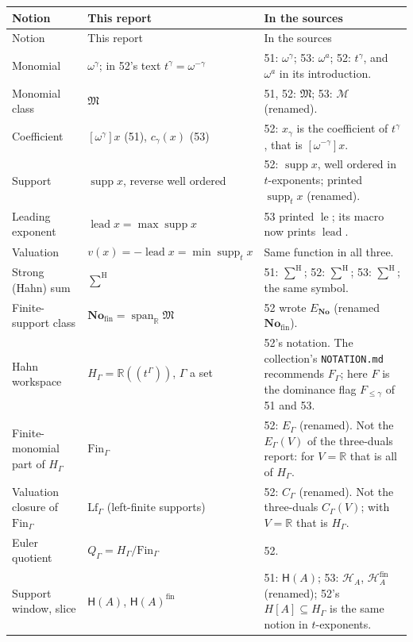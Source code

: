 \documentclass[11pt,letterpaper]{article}
\numberwithin{equation}{section}
\theoremstyle{definition}
\theoremstyle{remark}
\newcommand{\No}{\mathbf{No}}
\newcommand{\R}{\mathbb{R}}
\newcommand{\M}{\mathfrak{M}}
\newcommand{\Hahn}{\mathsf{H}}
\newcommand{\Fin}{\No_{\mathrm{fin}}}
\newcommand{\supp}{\operatorname{supp}}
\newcommand{\Span}{\operatorname{span}}
\newcommand{\lead}{\operatorname{lead}}
\newcommand{\sH}{\mathop{\sum}\nolimits^{\mathrm H}}
\newcommand{\hSum}{\mathop{\sum}\nolimits^{\mathrm H}}
\newcommand{\HSum}{\mathop{\sum}\nolimits^{\mathrm H}}
\newcommand{\FinS}[1]{\mathrm{Fin}_{#1}}%
\newcommand{\LfS}[1]{\mathrm{Lf}_{#1}}%
\begin{document}
\begin{center}
\small
\begin{longtable}{L{0.27\textwidth}L{0.27\textwidth}L{0.37\textwidth}}
\toprule
Notion & This report & In the sources\\
\midrule
\endfirsthead
\toprule
Notion & This report & In the sources\\
\midrule
\endhead
Monomial & \(\omega^\gamma\); in 52's text \(t^\gamma=\omega^{-\gamma}\) & 51: \(\omega^\gamma\); 53: \(\omega^a\); 52: \(t^\gamma\), and \(\omega^a\) in its introduction.\\
Monomial class & \(\M\) & 51, 52: \(\mathfrak M\); 53: \(\mathcal M\) (renamed).\\
Coefficient & \([\omega^\gamma]x\) (51), \(c_\gamma(x)\) (53) & 52: \(x_\gamma\) is the coefficient of \(t^\gamma\), that is \([\omega^{-\gamma}]x\).\\
Support & \(\supp x\), reverse well ordered & 52: \(\supp x\), well ordered in \(t\)-exponents; printed \(\supp_t x\) (renamed).\\
Leading exponent & \(\lead x=\max\supp x\) & 53 printed \(\operatorname{le}\); its macro now prints \(\lead\).\\
Valuation & \(v(x)=-\lead x=\min\supp_t x\) & Same function in all three.\\
Strong (Hahn) sum & \(\sH\) & 51: \(\sH\); 52: \(\hSum\); 53: \(\HSum\); the same symbol.\\
Finite-support class & \(\Fin=\Span_\R\M\) & 52 wrote \(E_{\No}\) (renamed \(\Fin\)).\\
Hahn workspace & \(H_\Gamma=\R((t^\Gamma))\), \(\Gamma\) a set & 52's notation.  The collection's \texttt{NOTATION.md} recommends \(F_\Gamma\); here \(F\) is the dominance flag \(F_{\le\gamma}\) of 51 and 53.\\
Finite-monomial part of \(H_\Gamma\) & \(\FinS\Gamma\) & 52: \(E_\Gamma\) (renamed).  Not the \(E_\Gamma(V)\) of the three-duals report: for \(V=\R\) that is all of \(H_\Gamma\).\\
Valuation closure of \(\FinS\Gamma\) & \(\LfS\Gamma\) (left-finite supports) & 52: \(C_\Gamma\) (renamed).  Not the three-duals \(C_\Gamma(V)\); with \(V=\R\) that is \(H_\Gamma\).\\
Euler quotient & \(Q_\Gamma=H_\Gamma/\FinS\Gamma\) & 52.\\
Support window, slice & \(\Hahn(A)\), \(\Hahn(A)^{\mathrm{fin}}\) & 51: \(\Hahn(A)\); 53: \(\mathcal H_A\), \(\mathcal H_A^{\mathrm{fin}}\) (renamed); 52's \(H[A]\subseteq H_\Gamma\) is the same notion in \(t\)-exponents.\\

\end{longtable}
\end{center}
\end{document}
